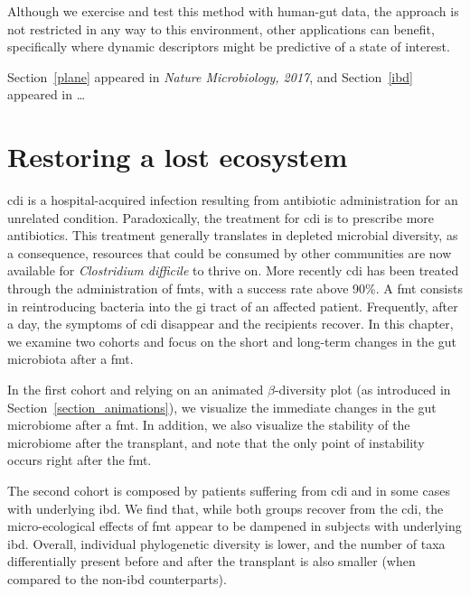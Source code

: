 \documentclass[12pt,chapterheads]{ucsd}
\begin{document}
Although we exercise and test this method with human-gut data, the approach is 
not restricted in any way to this environment, other applications can benefit, 
specifically where dynamic descriptors might be predictive of a state of 
interest.

Section~\ref{plane} appeared in \textsl{Nature Microbiology, 2017}, and 
Section~\ref{ibd} appeared in \dots

\ifdefined\RELEASE
    
    
\fi

\chapter{Restoring a lost ecosystem}\label{chapter_fmts}
\glsresetall

\gls{cdi} is a hospital-acquired infection resulting from antibiotic 
administration for an unrelated condition. Paradoxically, the treatment for 
\gls{cdi} is to prescribe more antibiotics. This treatment generally translates 
in depleted microbial diversity, as a consequence, resources that could be 
consumed by other communities are now available for \textit{Clostridium 
difficile} to thrive on.  More recently \gls{cdi} has been treated through the 
administration of \glspl{fmt}, with a success rate above 90\%\cite{RN4129}. A 
\gls{fmt} consists in reintroducing bacteria into the \gls{gi} tract of an 
affected patient. Frequently, after a day, the symptoms of \gls{cdi} disappear 
and the recipients recover. In this chapter, we examine two cohorts and focus 
on the short and long-term changes in the gut microbiota after a \gls{fmt}.

In the first cohort and relying on an animated $\beta$-diversity plot (as 
introduced in Section~\ref{section_animations}), we visualize the immediate 
changes in the gut microbiome after a \gls{fmt}. In addition, we also visualize 
the stability of the microbiome after the transplant, and note that the only 
point of instability occurs right after the \gls{fmt}.

The second cohort is composed by patients suffering from \gls{cdi} and in some 
cases with underlying \gls{ibd}. We find that, while both groups recover from 
the \gls{cdi}, the micro-ecological effects of \gls{fmt} appear to be dampened 
in subjects with underlying \gls{ibd}. Overall, individual phylogenetic 
diversity is lower, and the number of taxa differentially present before and 
after the transplant is also smaller (when compared to the non-\gls{ibd} 
counterparts).
\end{document}
